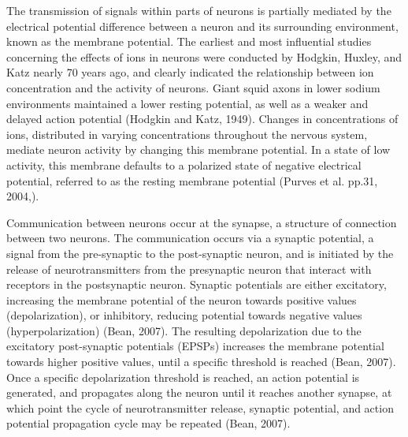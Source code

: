 \documentclass[11pt]{article}
\begin{document}
The transmission of signals within parts of neurons is partially mediated by the electrical potential difference between a neuron and its surrounding environment, known as the membrane potential. The earliest and most influential studies concerning the effects of ions in neurons were conducted by Hodgkin, Huxley, and Katz nearly 70 years ago, and clearly indicated the relationship between ion concentration and the activity of neurons. Giant squid axons in lower sodium environments maintained a lower resting potential, as well as a weaker and delayed action potential (Hodgkin and Katz, 1949). 
Changes in concentrations of ions, distributed in varying concentrations throughout the nervous system, mediate neuron activity by changing this membrane potential. In a state of low activity, this membrane defaults to a polarized state of negative electrical potential, referred to as the resting membrane potential (Purves et al. pp.31, 2004,).\par

Communication between neurons occur at the synapse, a structure of connection between two neurons. The communication occurs via a synaptic potential, a signal from the pre-synaptic to the post-synaptic neuron, and is initiated by the release of neurotransmitters from the presynaptic neuron that interact with receptors in the postsynaptic neuron. Synaptic potentials are either excitatory, increasing the membrane potential of the neuron towards positive values (depolarization), or inhibitory, reducing potential towards negative values (hyperpolarization) (Bean, 2007). The resulting depolarization due to the excitatory post-synaptic potentials (EPSPs) increases the membrane potential towards higher positive values, until a specific threshold is reached (Bean, 2007). Once a specific depolarization threshold is reached, an action potential is generated, and propagates along the neuron until it reaches another synapse, at which point the cycle of neurotransmitter release, synaptic potential, and action potential propagation cycle may be repeated (Bean, 2007).\par

\end{document}

